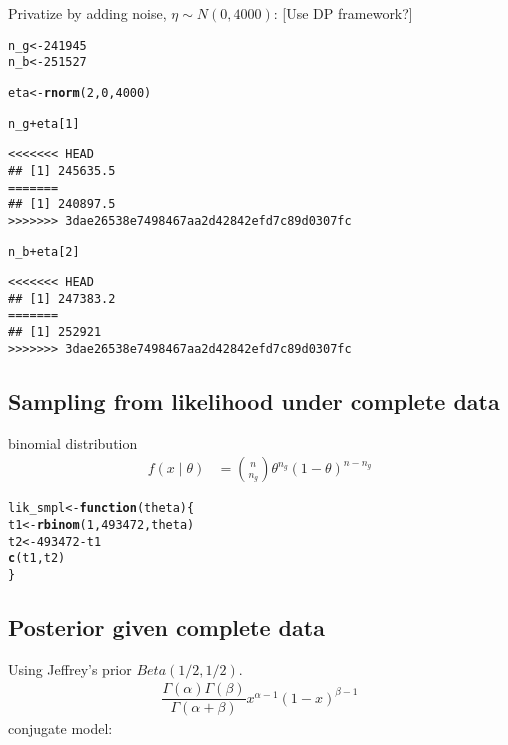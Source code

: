 \documentclass{article}\usepackage[]{graphicx}\usepackage[]{xcolor}
\makeatletter
\newcommand{\hlnum}[1]{\textcolor[rgb]{0.686,0.059,0.569}{#1}}%
\newcommand{\hlopt}[1]{\textcolor[rgb]{0,0,0}{#1}}%
\newcommand{\hlstd}[1]{\textcolor[rgb]{0.345,0.345,0.345}{#1}}%
\newcommand{\hlkwa}[1]{\textcolor[rgb]{0.161,0.373,0.58}{\textbf{#1}}}%
\newcommand{\hlkwb}[1]{\textcolor[rgb]{0.69,0.353,0.396}{#1}}%
\newcommand{\hlkwc}[1]{\textcolor[rgb]{0.333,0.667,0.333}{#1}}%
\newcommand{\hlkwd}[1]{\textcolor[rgb]{0.737,0.353,0.396}{\textbf{#1}}}%
\newenvironment{kframe}{%
 \def\at@end@of@kframe{}%
 \ifinner\ifhmode%
  \def\at@end@of@kframe{\end{minipage}}%
  \begin{minipage}{\columnwidth}%
 \fi\fi%
 \def\FrameCommand##1{\hskip\@totalleftmargin \hskip-\fboxsep
 \colorbox{shadecolor}{##1}\hskip-\fboxsep
     \hskip-\linewidth \hskip-\@totalleftmargin \hskip\columnwidth}%
 \MakeFramed {\advance\hsize-\width
   \@totalleftmargin\z@ \linewidth\hsize
   \@setminipage}}%
 {\par\unskip\endMakeFramed%
 \at@end@of@kframe}
\newenvironment{knitrout}{}{} %
\theoremstyle{definition}
\makeatother
\begin{document}
Privatize by adding noise, $\eta \sim N(0, 4000)$:
[Use DP framework?]
\begin{knitrout}
\color{fgcolor}\begin{kframe}
\begin{alltt}
\hlstd{n_g} \hlkwb{<-} \hlnum{241945}
\hlstd{n_b} \hlkwb{<-} \hlnum{251527}

\hlstd{eta} \hlkwb{<-} \hlkwd{rnorm}\hlstd{(}\hlnum{2}\hlstd{,}\hlnum{0}\hlstd{,}\hlnum{4000}\hlstd{)}

\hlstd{n_g} \hlopt{+} \hlstd{eta[}\hlnum{1}\hlstd{]}
\end{alltt}
\begin{verbatim}
<<<<<<< HEAD
## [1] 245635.5
=======
## [1] 240897.5
>>>>>>> 3dae26538e7498467aa2d42842efd7c89d0307fc
\end{verbatim}
\begin{alltt}
\hlstd{n_b} \hlopt{+} \hlstd{eta[}\hlnum{2}\hlstd{]}
\end{alltt}
\begin{verbatim}
<<<<<<< HEAD
## [1] 247383.2
=======
## [1] 252921
>>>>>>> 3dae26538e7498467aa2d42842efd7c89d0307fc
\end{verbatim}
\end{kframe}
\end{knitrout}

\subsection*{Sampling from likelihood under complete data}
binomial distribution
\begin{align*}
f(x \mid \theta) &= \binom{n}{n_g} \theta^{n_g}(1-\theta)^{n-n_g}
\end{align*}

\begin{knitrout}
\color{fgcolor}\begin{kframe}
\begin{alltt}
\hlstd{lik_smpl} \hlkwb{<-} \hlkwa{function}\hlstd{(}\hlkwc{theta}\hlstd{) \{}
  \hlstd{t1} \hlkwb{<-} \hlkwd{rbinom}\hlstd{(}\hlnum{1}\hlstd{,} \hlnum{493472}\hlstd{, theta)}
  \hlstd{t2} \hlkwb{<-} \hlnum{493472} \hlopt{-} \hlstd{t1}
  \hlkwd{c}\hlstd{(t1,t2)}
\hlstd{\}}
\end{alltt}
\end{kframe}
\end{knitrout}

\subsection*{Posterior given complete data}
Using Jeffrey's prior $Beta(1/2,1/2)$.
\begin{align*}
\dfrac{\Gamma(\alpha)\Gamma(\beta)}{\Gamma(\alpha + \beta)}x^{\alpha -1}(1-x)^{\beta-1}
\end{align*}
conjugate model:




\nocite{*}


\end{document}

